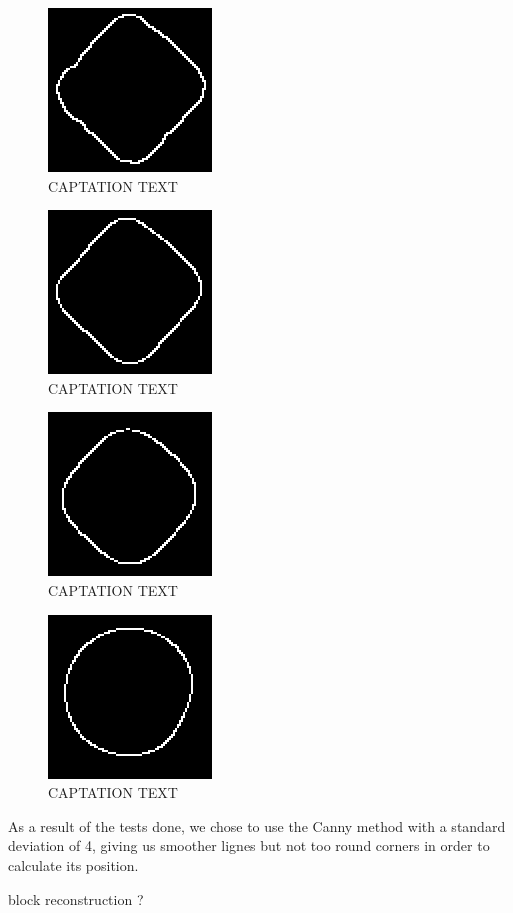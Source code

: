 	\begin{figure}[hb]
  \centering
  \includegraphics[scale=0.5]{figures/Canny_sqrt2.png}
  \caption[LABEL] {CAPTATION TEXT}
\end{figure}	
  	\begin{figure}[hb]
  \centering
  \includegraphics[scale=0.5]{figures/Canny_4.png}
  \caption[LABEL] {CAPTATION TEXT}
\end{figure}	
  	\begin{figure}[hb]
  \centering
  \includegraphics[scale=0.5]{figures/Canny_10.png}
  \caption[LABEL] {CAPTATION TEXT}
\end{figure}	
  	\begin{figure}[hb]
  \centering
  \includegraphics[scale=0.5]{figures/Canny_25.png}
  \caption[LABEL] {CAPTATION TEXT}
\end{figure}	
	

As a result of the tests done, we chose to use the Canny method with a standard deviation of 4, giving us smoother lignes but not too round corners in order to calculate its position.


\begin{flushleft}
 block reconstruction ?
 \end{flushleft}